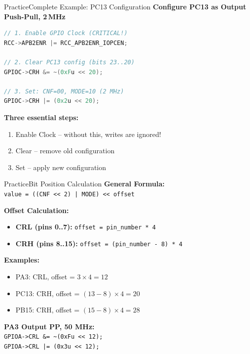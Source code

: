 \documentclass{beamer}
\begin{document}
\begin{frame}[fragile]{Practice}{Complete Example: PC13 Configuration}
	\textbf{Configure PC13 as Output Push-Pull, 2\,MHz}
	
	\begin{lstlisting}[language=C, basicstyle=\ttfamily\footnotesize]
// 1. Enable GPIO Clock (CRITICAL!)
RCC->APB2ENR |= RCC_APB2ENR_IOPCEN;
		
// 2. Clear PC13 config (bits 23..20)
GPIOC->CRH &= ~(0xFu << 20);
		
// 3. Set: CNF=00, MODE=10 (2 MHz)
GPIOC->CRH |= (0x2u << 20);
	\end{lstlisting}
	
	\textbf{Three essential steps:}
	\begin{enumerate}
		\item Enable Clock – without this, writes are ignored!
		\item Clear – remove old configuration
		\item Set – apply new configuration
	\end{enumerate}
\end{frame}
\begin{frame}[fragile]{Practice}{Bit Position Calculation}
	\textbf{General Formula:}\\
	\texttt{value = ((CNF << 2) | MODE) << offset}
	
	\medskip
	\textbf{Offset Calculation:}
	\begin{itemize}
		\item \textbf{CRL (pins 0..7):} \texttt{offset = pin\_number * 4}
		\item \textbf{CRH (pins 8..15):} \texttt{offset = (pin\_number - 8) * 4}
	\end{itemize}
	
	\textbf{Examples:}
	\begin{itemize}
		\item PA3: CRL, offset = $3 \times 4 = 12$
		\item PC13: CRH, offset = $(13-8) \times 4 = 20$
		\item PB15: CRH, offset = $(15-8) \times 4 = 28$
	\end{itemize}
	
	\textbf{PA3 Output PP, 50 MHz:}\\
	\texttt{GPIOA->CRL \&= \textasciitilde(0xFu << 12);}\\
	\texttt{GPIOA->CRL |= (0x3u << 12);}
\end{frame}
\end{document}
